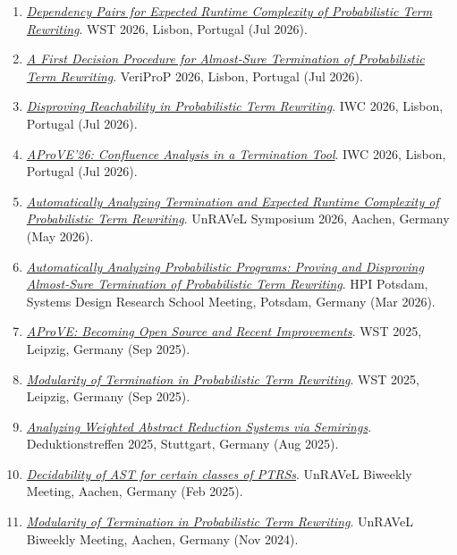 \documentclass[letterpaper,11pt]{article}
\begin{document}
    \begin{enumerate}
      \item \href{https://jckassing.com/files/slides/WST26.pdf}{\textit{Dependency Pairs for Expected Runtime Complexity of Probabilistic Term Rewriting}}. WST 2026, Lisbon, Portugal (Jul 2026).
      \item \href{https://jckassing.com/files/slides/VeriProP26.pdf}{\textit{A First Decision Procedure for Almost-Sure Termination of Probabilistic Term Rewriting}}. VeriProP 2026, Lisbon, Portugal (Jul 2026).
      \item \href{https://jckassing.com/files/slides/IWC26-01.pdf}{\textit{Disproving Reachability in Probabilistic Term Rewriting}}. IWC 2026, Lisbon, Portugal (Jul 2026).
      \item \href{https://jckassing.com/files/slides/CoCo26.pdf}{\textit{AProVE'26: Confluence Analysis in a Termination Tool}}. IWC 2026, Lisbon, Portugal (Jul 2026).
      \item \href{https://jckassing.com/files/slides/UnRAVeL_Symposium.pdf}{\textit{Automatically Analyzing Termination and Expected Runtime Complexity of Probabilistic Term Rewriting}}. UnRAVeL Symposium 2026, Aachen, Germany (May 2026).
      \item \href{https://jckassing.com/files/slides/HPI.pdf}{\textit{Automatically Analyzing Probabilistic Programs: Proving and Disproving Almost-Sure Termination of Probabilistic Term Rewriting}}. HPI Potsdam, Systems Design Research School Meeting, Potsdam, Germany (Mar 2026).
      \item \href{https://jckassing.com/files/slides/WST25_AProVE.pdf}{\textit{AProVE: Becoming Open Source and Recent Improvements}}. WST 2025, Leipzig, Germany (Sep 2025).
      \item \href{https://jckassing.com/files/slides/WST25_Modularity.pdf}{\textit{Modularity of Termination in Probabilistic Term Rewriting}}. WST 2025, Leipzig, Germany (Sep 2025).
      \item \href{https://jckassing.com/files/slides/Deduktionstreffen25.pdf}{\textit{Analyzing Weighted Abstract Reduction Systems via Semirings}}. Deduktionstreffen 2025, Stuttgart, Germany (Aug 2025).
      \item \href{https://jckassing.com/files/slides/GroundAST.pdf}{\textit{Decidability of AST for certain classes of PTRSs}}. UnRAVeL Biweekly Meeting, Aachen, Germany (Feb 2025).
      \item \href{https://jckassing.com/files/slides/Modularity.pdf}{\textit{Modularity of Termination in Probabilistic Term Rewriting}}. UnRAVeL Biweekly Meeting, Aachen, Germany (Nov 2024).

\end{enumerate}
\end{document}
